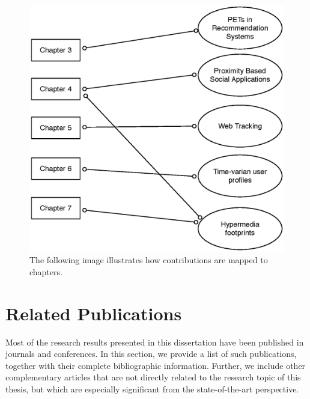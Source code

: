 \begin{figure}
\includegraphics[width=\textwidth]{figures/thesis-map.eps}
\caption[Advertising services feedback loop]{The following image illustrates how contributions are mapped to chapters.}
\label{fig:contributions}
\end{figure}

\section{Related Publications}

Most of the research results presented in this dissertation have been published in journals and conferences. In this section, we provide a list of such publications, together with their complete bibliographic information. Further, we include other complementary articles that are not directly related to the research topic of this thesis, but which are especially
significant from the state-of-the-art perspective.

